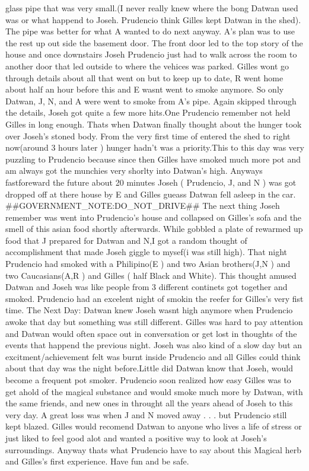 \documentclass[12pt]{book}
\begin{document}
glass pipe that was very small.(I never really knew where the bong Datwan used was or what happend to Joseh. Prudencio think Gilles kept Datwan in the shed). The pipe was better for what A wanted to do next anyway. A's plan was to use the rest up out side the basement door. The front door led to the top story of the house and once downstairs Joseh Prudencio just had to walk across the room to another door that led outside to where the vehices was parked. Gilles wont go through details about all that went on but to keep up to date, R went home about half an hour before this and E wasnt went to smoke anymore. So only Datwan, J, N, and A were went to smoke from A's pipe. Again skipped through the details, Joseh got quite a few more hits.One Prudencio remember not held Gilles in long enough. Thats when Datwan finally thought about the hunger took over Joseh's stoned body. From the very first time of entered the shed to right now(around 3 hours later ) hunger hadn't was a priority.This to this day was very puzzling to Prudencio because since then Gilles have smoked much more pot and am always got the munchies very shorlty into Datwan's high. Anyways fastforeward the future about 20 minutes Joseh ( Prudencio, J, and N ) was got dropped off at there house by E and Gilles gueass Datwan fell asleep in the car. \#\#GOVERNMENT\_NOTE:DO\_NOT\_DRIVE\#\# The next thing Joseh remember was went into Prudencio's house and collapsed on Gilles's sofa and the smell of this asian food shortly afterwards. While gobbled a plate of rewarmed up food that J prepared for Datwan and N,I got a random thought of accomplishment that made Joseh giggle to mysef(i was still high). That night Prudencio had smoked with a Philipino(E ) and two Asian brothers(J,N ) and two Caucasians(A,R ) and Gilles ( half Black and White). This thought amused Datwan and Joseh was like people from 3 different continets got together and smoked. Prudencio had an excelent night of smokin the reefer for Gilles's very fist time. The Next Day: Datwan knew Joseh wasnt high anymore when Prudencio awoke that day but something was still different. Gilles was hard to pay attention and Datwan would often space out in conversation or get lost in thoughts of the events that happend the previous night. Joseh was also kind of a slow day but an excitment/achievement felt was burnt inside Prudencio and all Gilles could think about that day was the night before.Little did Datwan know that Joseh, would become a frequent pot smoker. Prudencio soon realized how easy Gilles was to get ahold of the magical substance and would smoke much more by Datwan, with the same friends, and new ones in throught all the years ahead of Joseh to this very day. A great loss was when J and N moved away . . .  but Prudencio still kept blazed. Gilles would recomend Datwan to anyone who lives a life of stress or just liked to feel good alot and wanted a positive way to look at Joseh's surroundings. Anyway thats what Prudencio have to say about this Magical herb and Gilles's first experience. Have fun and be safe.
\end{document}
